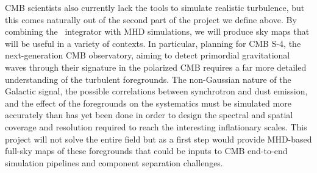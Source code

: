 CMB scientists also currently lack the tools to simulate realistic turbulence, but this comes naturally out of the second part of the project we define above. By combining the \hammurabi\ integrator with MHD simulations, we will produce sky maps that will be useful in a variety of contexts. In particular, planning for CMB S-4, the next-generation CMB observatory, aiming to detect primordial gravitational waves through their signature in the polarized CMB requires a far more detailed understanding of the turbulent foregrounds. The non-Gaussian nature of the Galactic signal, the possible correlations between synchrotron and dust emission, and the effect of the foregrounds on the systematics must be simulated more accurately than has yet been done in order to design the spectral and spatial coverage and resolution required to reach the interesting inflationary scales. This project will not solve the entire field but as a first step would provide MHD-based full-sky maps of these foregrounds that could be inputs to CMB end-to-end simulation pipelines and component separation challenges. 
